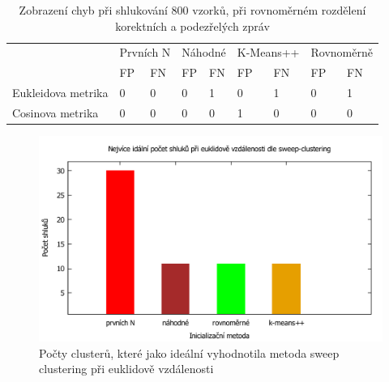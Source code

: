 \documentclass[thesis=M,czech]{FITthesis}[2012/10/20]
\newcommand{\tmpframe}[1]{\fbox{#1}}
\renewcommand{\tmpframe}[1]{#1}
\begin{document}
		\begin{table}[htb]\centering
			\centering
			\caption{Zobrazení chyb při shlukování 800 vzorků, při rovnoměrném rozdělení korektních a podezřelých zpráv}
			\label{tab:clustering_errors}
			\begin{tabular}{|l|llllllll}
				\hline
				\multirow{2}{*}{}  & \multicolumn{2}{l|}{Prvních N}                    & \multicolumn{2}{l|}{Náhodné}                      & \multicolumn{2}{l|}{K-Means++}                    & \multicolumn{2}{l|}{Rovnoměrně}                   \\
				& \multicolumn{1}{l|}{FP} & \multicolumn{1}{l|}{FN} & \multicolumn{1}{l|}{FP} & \multicolumn{1}{l|}{FN} & \multicolumn{1}{l|}{FP} & \multicolumn{1}{l|}{FN} & \multicolumn{1}{l|}{FP} & \multicolumn{1}{l|}{FN} \\ \hline
				Eukleidova metrika & 0                       & 0                       & 0                       & 1                       & 0                       & 1                       & 0                       & 1                       \\ \hline
				Cosinova metrika   & 0                       & 0                       & 0                       & 0                       & 1                       & 0                       & 0                       & 0                       \\ \hline
			\end{tabular}
		\end{table}
	
		\begin{figure}[htb]\centering
			\tmpframe{\includegraphics[width=\textwidth]{./img/euklide-sweep-clusters}}	
			\caption{Počty clusterů, které jako ideální vyhodnotila metoda sweep clustering při euklidově vzdálenosti}
			\label{fig:k-means-num-clusters-euklid}
		\end{figure}
	
\end{document}
